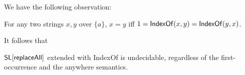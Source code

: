 We have the following observation: 
\begin{lemma}
	For any two strings $x,y$ over $\{a\}$, $x=y$ iff $1=\mathsf{IndexOf}(x,y)=\mathsf{IndexOf}(y,x)$.  
\end{lemma}

It follows that 
\begin{proposition}
	$\mathsf{SL}[\mathsf{replaceAll}]$ extended with IndexOf is undecidable, regardless of the first-occurrence and the anywhere semantics. 
\end{proposition}



